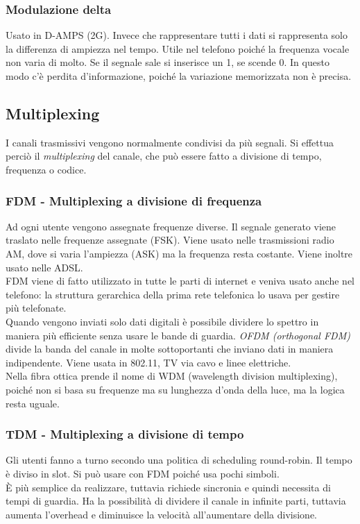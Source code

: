 \documentclass[10pt,a4paper,twoside]{article}
\begin{document}
\subsubsection{Modulazione delta}
Usato in D-AMPS (2G). Invece che rappresentare tutti i dati si rappresenta solo la differenza di ampiezza nel tempo. Utile nel telefono poiché la frequenza vocale non varia di molto.
Se il segnale sale si inserisce un 1, se scende 0. In questo modo c'è perdita d'informazione, poiché la variazione memorizzata non è precisa.

\subsection{Multiplexing}
I canali trasmissivi vengono normalmente condivisi da più segnali. Si effettua perciò il \textit{multiplexing} del canale, che può essere fatto a divisione di tempo, frequenza o codice.

\subsubsection{FDM - Multiplexing a divisione di frequenza}
Ad ogni utente vengono assegnate frequenze diverse. Il segnale generato viene traslato nelle frequenze assegnate (FSK). Viene usato nelle trasmissioni radio AM, dove si varia l'ampiezza (ASK) ma la frequenza resta costante.
Viene inoltre usato nelle ADSL.\\
FDM viene di fatto utilizzato in tutte le parti di internet e veniva usato anche nel telefono: la struttura gerarchica della prima rete telefonica lo usava per gestire più telefonate.\\
Quando vengono inviati solo dati digitali è possibile dividere lo spettro in maniera più efficiente senza usare le bande di guardia. \textit{OFDM (orthogonal FDM)} divide la banda del canale in molte sottoportanti che inviano dati in maniera indipendente. Viene usata in 802.11, TV via cavo e linee elettriche.\\
Nella fibra ottica prende il nome di WDM (wavelength division multiplexing), poiché non si basa su frequenze ma su lunghezza d'onda della luce, ma la logica resta uguale.

\subsubsection{TDM - Multiplexing a divisione di tempo}
Gli utenti fanno a turno secondo una politica di scheduling round-robin. Il tempo è diviso in slot. Si può usare con FDM poiché usa pochi simboli.\\
È più semplice da realizzare, tuttavia richiede sincronia e quindi necessita di tempi di guardia. Ha la possibilità di dividere il canale in infinite parti, tuttavia aumenta l'overhead e diminuisce la velocità all'aumentare della divisione.
\end{document}
